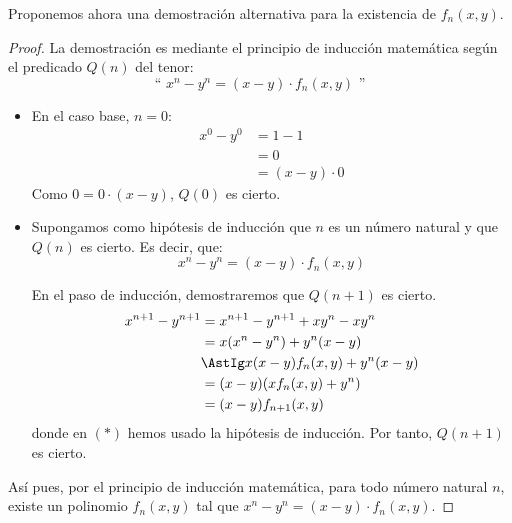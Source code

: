 \documentclass[12pt]{article}
\begin{document}
\begin{ejercicio}[Inducción]
            \begin{observacion}
                Proponemos ahora una demostración alternativa para la existencia de $f_n(x, y)$.
                \begin{proof}
                La demostración es mediante el principio de inducción matemática
                según el predicado $Q(n)$ del tenor:
                \begin{equation*}
                    \text{`` }x^n - y^n = (x-y)\cdot f_n(x, y)\text{ ''}
                \end{equation*}
                \begin{itemize}
                    \item En el caso base, $n=0$:
                        \begin{align*}
                            x^0 - y^0 &= 1 - 1 \\&= 0 \\&= (x-y)\cdot 0
                        \end{align*}
                        Como $0 = 0\cdot (x-y)$, $Q(0)$ es cierto.

                    \item Supongamos como hipótesis de inducción que $n$ es un número natural y que $Q(n)$ es cierto.
                    Es decir, que:
                        \begin{equation*}
                            x^n - y^n = (x-y)\cdot f_n(x, y)
                        \end{equation*}

                        En el paso de inducción, demostraremos que $Q(n+1)$ es cierto.
                        \begin{align*}
                            x^{n+1} - y^{n+1} &= x^{n+1} - y^{n+1} + xy^n - xy^n \\
                            &= x(x^n - y^n) +y^n(x-y) \\
                            &\AstIg x(x-y)f_n(x, y) + y^n(x-y) \\
                            &= (x-y)(xf_n(x, y) + y^n) \\
                            &= (x-y)f_{n+1}(x, y)
                        \end{align*}
                        donde en $(\ast)$ hemos usado la hipótesis de inducción. Por tanto, $Q(n+1)$ es cierto.
                \end{itemize}

                Así pues, por el principio de inducción matemática, para todo número natural $n$, existe un polinomio $f_n(x, y)$ tal que $x^n - y^n = (x-y)\cdot f_n(x, y)$.
                \end{proof}
            \end{observacion}
    \end{ejercicio}
\end{document}
